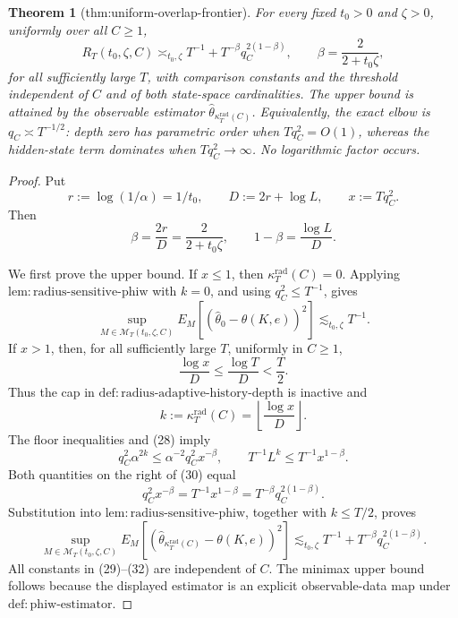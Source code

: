 \documentclass{article}
\newtheorem{theorem}{Theorem}
\begin{document}
\begin{theorem}[thm:uniform-overlap-frontier]\label{thm:uniform-overlap-frontier}
For every fixed \(t_0>0\) and \(\zeta>0\), uniformly over all \(C\ge1\),
\[
 R_T(t_0,\zeta,C)
 \asymp_{t_0,\zeta}
 T^{-1}+T^{-\beta}q_C^{2(1-\beta)},
 \qquad
 \beta=\frac{2}{2+t_0\zeta},
\]
for all sufficiently large \(T\), with comparison constants and the threshold independent of \(C\) and of both state-space cardinalities.  The upper bound is attained by the observable estimator \(\widehat\theta_{\kappa_T^{\mathrm{rad}}(C)}\).  Equivalently, the exact elbow is \(q_C\asymp T^{-1/2}\): depth zero has parametric order when \(Tq_C^2=O(1)\), whereas the hidden-state term dominates when \(Tq_C^2\to\infty\).  No logarithmic factor occurs.
\end{theorem}
\begin{proof}
Put
\[
 r:=\log(1/\alpha)=1/t_0,
 \qquad
 D:=2r+\log L,
 \qquad
 x:=Tq_C^2.
\]
Then
\[
 \beta=\frac{2r}{D}=\frac{2}{2+t_0\zeta},
 \qquad
 1-\beta=\frac{\log L}{D}. \tag{28}
\]

We first prove the upper bound.  If \(x\le1\), then
\(\kappa_T^{\mathrm{rad}}(C)=0\).  Applying
\(\mathrm{lem{:}radius\text{-}sensitive\text{-}phiw}\) with \(k=0\), and using
\(q_C^2\le T^{-1}\), gives
\[
 \sup_{M\in\mathcal M_T(t_0,\zeta,C)}
 E_M[(\widehat\theta_0-\theta(K,e))^2]
 \lesssim_{t_0,\zeta}T^{-1}. \tag{29}
\]
If \(x>1\), then, for all sufficiently large \(T\), uniformly in \(C\ge1\),
\[
 \frac{\log x}{D}\le\frac{\log T}{D}<\frac T2.
\]
Thus the cap in
\(\mathrm{def{:}radius\text{-}adaptive\text{-}history\text{-}depth}\) is inactive and
\[
 k:=\kappa_T^{\mathrm{rad}}(C)=\left\lfloor\frac{\log x}{D}\right\rfloor.
\]
The floor inequalities and (28) imply
\[
 q_C^2\alpha^{2k}
 \le\alpha^{-2}q_C^2x^{-\beta},
 \qquad
 T^{-1}L^k
 \le T^{-1}x^{1-\beta}. \tag{30}
\]
Both quantities on the right of (30) equal
\[
 q_C^2x^{-\beta}
 =T^{-1}x^{1-\beta}
 =T^{-\beta}q_C^{2(1-\beta)}. \tag{31}
\]
Substitution into
\(\mathrm{lem{:}radius\text{-}sensitive\text{-}phiw}\), together with \(k\le T/2\), proves
\[
 \sup_{M\in\mathcal M_T(t_0,\zeta,C)}
 E_M[(\widehat\theta_{\kappa_T^{\mathrm{rad}}(C)}-\theta(K,e))^2]
 \lesssim_{t_0,\zeta}
 T^{-1}+T^{-\beta}q_C^{2(1-\beta)}. \tag{32}
\]
All constants in (29)--(32) are independent of \(C\).  The minimax upper
bound follows because the displayed estimator is an explicit observable-data
map under \(\mathrm{def{:}phiw\text{-}estimator}\).


\end{proof}
\end{document}
